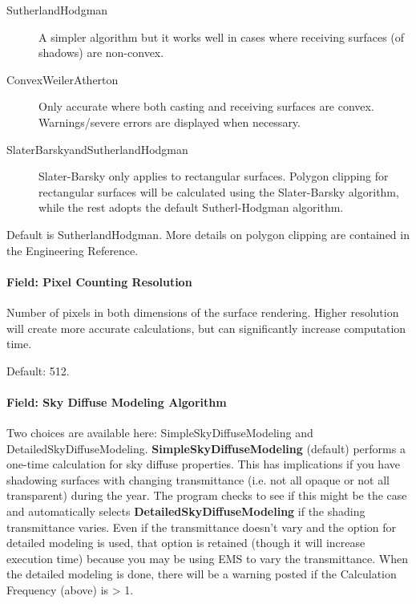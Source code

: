 \begin{description}
  \item[SutherlandHodgman] A simpler algorithm but it works well in cases where receiving surfaces (of shadows) are non-convex.
  \item[ConvexWeilerAtherton] Only accurate where both casting and receiving surfaces are convex. Warnings/severe errors are displayed when necessary.
  \item[SlaterBarskyandSutherlandHodgman] Slater-Barsky only applies to rectangular surfaces. Polygon clipping for rectangular surfaces will be calculated using the Slater-Barsky algorithm, while the rest adopts the default Sutherl-Hodgman algorithm.
\end{description}

Default is SutherlandHodgman. More details on polygon clipping are contained in the Engineering Reference.

\paragraph{Field: Pixel Counting Resolution}

Number of pixels in both dimensions of the surface rendering. Higher resolution will create more accurate calculations, but can significantly increase computation time.

Default: 512.

\paragraph{Field: Sky Diffuse Modeling Algorithm}\label{field-sky-diffuse-modeling-algorithm}

Two choices are available here: SimpleSkyDiffuseModeling and DetailedSkyDiffuseModeling. \textbf{SimpleSkyDiffuseModeling} (default) performs a one-time calculation for sky diffuse properties. This has implications if you have shadowing surfaces with changing transmittance (i.e. not all opaque or not all transparent) during the year. The program checks to see if this might be the case and automatically selects \textbf{DetailedSkyDiffuseModeling} if the shading transmittance varies. Even if the transmittance doesn't vary and the option for detailed modeling is used, that option is retained (though it will increase execution time) because you may be using EMS to vary the transmittance. When the detailed modeling is done, there will be a warning posted if the Calculation Frequency (above) is \textgreater{} 1.

